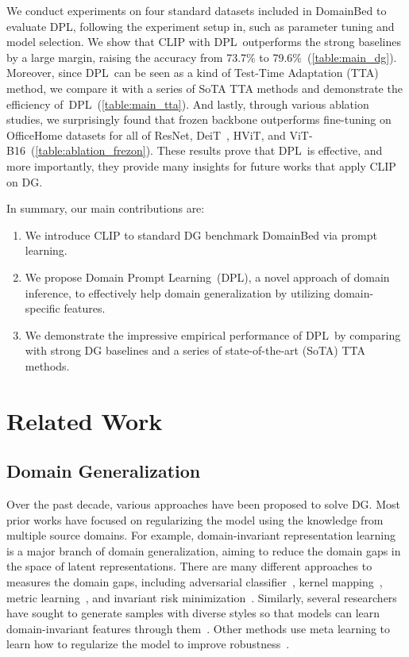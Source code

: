 \documentclass[letterpaper]{article} \usepackage[]{aaai23}
\newcommand{\dplshort}{DPL}
\newcommand{\dpllong}{Domain Prompt Learning}
\begin{document}
We conduct experiments on four standard datasets included in DomainBed to evaluate \dplshort, following the experiment setup in\cite{gulrajani2020search,iwasawa2021testtime}, such as parameter tuning and model selection.
We show that CLIP with \dplshort~outperforms the strong baselines by a large margin, raising the accuracy from 73.7\% to 79.6\%~(\autoref{table:main_dg}).
Moreover, since \dplshort~can be seen as a kind of Test-Time Adaptation (TTA) method, we compare it with a series of SoTA TTA methods and demonstrate the efficiency of~\dplshort~(\autoref{table:main_tta}).
And lastly, through various ablation studies, we surprisingly found that frozen backbone outperforms fine-tuning on OfficeHome datasets for all of ResNet, DeiT~\cite{touvron2021training}, HViT, and ViT-B16~(\autoref{table:ablation_frezon}).
These results prove that \dplshort~is effective, and more importantly, they provide many insights for future works that apply CLIP on DG.

In summary, our main contributions are:
\begin{enumerate}
    \item We introduce CLIP to standard DG benchmark DomainBed via prompt learning.
    \item We propose \dpllong~(\dplshort), a novel approach of domain inference, to effectively help domain generalization by utilizing domain-specific features.
    \item We demonstrate the impressive empirical performance of \dplshort~by comparing with strong DG baselines and a series of state-of-the-art (SoTA) TTA methods.
\end{enumerate}

\section{Related Work}
\subsection{Domain Generalization}

Over the past decade, various approaches have been proposed to solve DG. 
Most prior works have focused on regularizing the model using the knowledge from multiple source domains.
For example, domain-invariant representation learning~\cite{ganin2016domainadversarial} is a major branch of domain generalization, aiming to reduce the domain gaps in the space of latent representations. 
There are many different approaches to measures the domain gaps, 
including adversarial classifier~\cite{li2018domain,ganin2015unsupervised,ganin2016domainadversarial},
kernel mapping~\cite{blanchard2011generalizing,grubinger2015domain}, 
metric learning~\cite{motiian2017unified,jin2020feature}, 
and invariant risk minimization~\cite{arjovsky2020invariant}. 
Similarly, several researchers have sought to generate samples with diverse styles so that models can learn domain-invariant features through them~\cite{shankar2018generalizing,zhou2020deep,borlino2021rethinking}. 
Other methods use meta learning to learn how to regularize the model to improve robustness~\cite{dou2019domain,li2017learning}.
\end{document}
